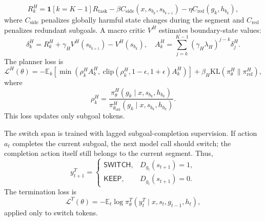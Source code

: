 \documentclass{article}
\newcommand{\wei}[1]{\textcolor{red}{#1}}
\begin{document}
\begin{equation}
R_k^H
=
\mathbf{1}[k=K-1]R_{\mathrm{task}}
-
\beta C_{\mathrm{side}}(x,s_{b_k},s_{b_{k+1}})
-
\eta C_{\mathrm{red}}(g_k,h_{b_k}),
\label{eq:high_reward}
\end{equation}
where $C_{\mathrm{side}}$ penalizes globally harmful state changes during the segment and $C_{\mathrm{red}}$ penalizes redundant subgoals. A macro critic $V^H$ estimates boundary-state values:
\begin{equation}
\delta_k^H
=
R_k^H+\gamma_H V^H(s_{b_{k+1}})-V^H(s_{b_k}),
\quad
A_k^H
=
\sum_{j=k}^{K-1}
(\gamma_H\lambda_H)^{j-k}\delta_j^H.
\label{eq:macro_gae}
\end{equation}
The planner loss is
\begin{equation}
\mathcal{L}^H(\theta)
=
-\mathbb{E}_k
\left[
\min
\left(
\rho_k^H A_k^H,\ 
\mathrm{clip}(\rho_k^H,1-\epsilon,1+\epsilon)A_k^H
\right)
\right]
+
\beta_H\mathrm{KL}(\pi_\theta^H\|\pi_{\mathrm{ref}}^H),
\label{eq:high_loss}
\end{equation}
where
\begin{equation}
\rho_k^H
=
\frac{
\pi_\theta^H(g_k\mid x,s_{b_k},h_{b_k})
}{
\pi_{\theta_{\mathrm{old}}}^H(g_k\mid x,s_{b_k},h_{b_k})
}.
\end{equation}
This loss updates only subgoal tokens.



The switch span is trained with lagged subgoal-completion supervision. If action $a_t$ completes the current subgoal, the next model call should switch; the completion action itself still belongs to the current segment. Thus,
\begin{equation}
y_{t+1}^T
=
\begin{cases}
\mathsf{SWITCH}, & D_{g_t}(s_{t+1})=1,\\
\mathsf{KEEP}, & D_{g_t}(s_{t+1})=0.
\end{cases}
\label{eq:switch_target}
\end{equation}
The termination loss is
\begin{equation}
\mathcal{L}^T(\theta)
=
-\mathbb{E}_t
\log
\pi_\theta^T(y_t^T\mid x,s_t,g_{t-1},h_t),
\label{eq:switch_loss}
\end{equation}
applied only to switch tokens.
\end{document}
